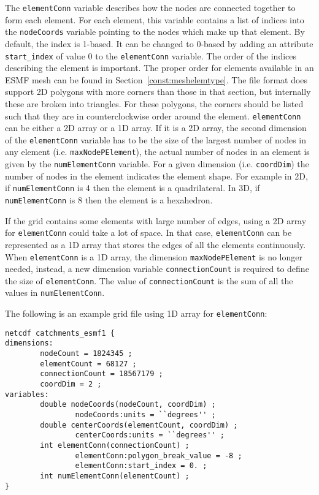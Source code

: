  The {\tt elementConn} variable describes how the nodes are connected together to form each element. For each element, this variable contains a list of indices into the {\tt nodeCoords} variable pointing to the nodes which make up that
 element. By default, the index is 1-based.  It can be changed to 0-based by adding an attribute 
{\tt start\_index} of value 0 to the {\tt elementConn} variable.  The order of the indices describing the element is important.
 The proper order for elements available in an ESMF mesh can be found in Section~\ref{const:meshelemtype}. The file format does support 2D polygons with more
 corners than those in that section, but internally these are broken into triangles. For these polygons, the corners should
 be listed such that they are in counterclockwise order around the element.
{\tt elementConn} can be either a 2D array or a 1D array.  If it is a 2D array, the second
 dimension of the {\tt elementConn} variable has to be the size of the largest number of nodes in any element (i.e. {\tt maxNodePElement}), the actual number of
 nodes in an element is given by the {\tt numElementConn} variable. For a given dimension (i.e. {\tt coordDim}) the number of nodes in the element
 indicates the element shape. For example in 2D, if {\tt numElementConn} is 4 then the element is a quadrilateral. In 3D, if {\tt numElementConn} is 8
 then the element is a hexahedron.

If the grid contains some elements with large number of edges, using a 2D array for {\tt elementConn} could take a lot of space.  
In that case, {\tt elementConn} can be represented as a 1D array that stores the edges of all the elements continuously.  When {\tt elementConn} is a 1D array, the dimension {\tt maxNodePElement} is no longer needed, instead, a new dimension variable {\tt connectionCount}
is required to define the size of {\tt elementConn}.  The value of {\tt connectionCount} is the sum of all the values in {\tt numElementConn}.

The following is an example grid file using 1D array for {\tt elementConn}:

\begin{verbatim}
netcdf catchments_esmf1 {
dimensions:
        nodeCount = 1824345 ;
        elementCount = 68127 ;
        connectionCount = 18567179 ;
        coordDim = 2 ;
variables:
        double nodeCoords(nodeCount, coordDim) ;
                nodeCoords:units = ``degrees'' ;
        double centerCoords(elementCount, coordDim) ;
                centerCoords:units = ``degrees'' ;
        int elementConn(connectionCount) ;
                elementConn:polygon_break_value = -8 ;
                elementConn:start_index = 0. ;
        int numElementConn(elementCount) ;
}
\end{verbatim}

